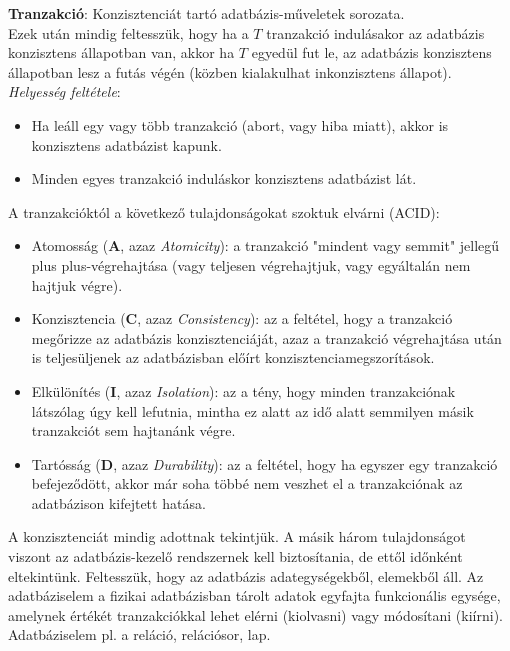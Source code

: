 \documentclass[12pt,margin=0px]{article}
\newcommand\lword[1]{\leavevmode\nobreak\hskip0pt plus\linewidth\penalty50\hskip0pt plus-\linewidth\nobreak #1}
\begin{document}
	\noindent \textbf{Tranzakció}: Konzisztenciát tartó adatbázis-műveletek sorozata.\\
    Ezek után mindig feltesszük, hogy ha a $T$ tranzakció indulásakor az adatbázis konzisztens állapotban van, akkor ha $T$ egyedül fut le, az adatbázis konzisztens állapotban lesz a futás végén (közben kialakulhat inkonzisztens állapot).\\

	\noindent \emph{Helyesség feltétele}:
	\begin{itemize}
		\item	Ha leáll egy vagy több tranzakció (abort, vagy hiba miatt), akkor is konzisztens adatbázist kapunk.
		\item	Minden egyes tranzakció induláskor konzisztens adatbázist lát.
	\end{itemize}
	
	\noindent A tranzakcióktól a következő tulajdonságokat szoktuk elvárni (ACID):
	
	\begin{itemize}
		\item	Atomosság (\textbf{A}, azaz \emph{Atomicity}): a tranzakció "mindent vagy semmit" jellegű \lword{végrehajtása} (vagy teljesen végrehajtjuk, vagy egyáltalán nem hajtjuk végre).
		\item	Konzisztencia (\textbf{C}, azaz \emph{Consistency}): az a feltétel, hogy a tranzakció megőrizze az adatbázis konzisztenciáját, azaz a tranzakció végrehajtása után is teljesüljenek az adatbázisban előírt konzisztenciamegszorítások.
		\item	Elkülönítés (\textbf{I}, azaz \emph{Isolation}): az a tény, hogy minden tranzakciónak látszólag úgy kell lefutnia, mintha ez alatt az idő alatt semmilyen másik tranzakciót sem hajtanánk végre.
		\item	Tartósság (\textbf{D}, azaz \emph{Durability}): az a feltétel, hogy ha egyszer egy tranzakció befejeződött, akkor már soha többé nem veszhet el a tranzakciónak az adatbázison kifejtett hatása.	
	\end{itemize}
    A konzisztenciát mindig adottnak tekintjük. A másik három tulajdonságot viszont az adatbázis-kezelő rendszernek kell biztosítania, de ettől időnként eltekintünk. Feltesszük, hogy az adatbázis adategységekből, elemekből áll. Az adatbáziselem a fizikai adatbázisban tárolt adatok egyfajta funkcionális egysége, amelynek értékét tranzakciókkal lehet elérni (kiolvasni) vagy módosítani (kiírni). Adatbáziselem pl. a reláció, relációsor, lap.
	
\end{document}
